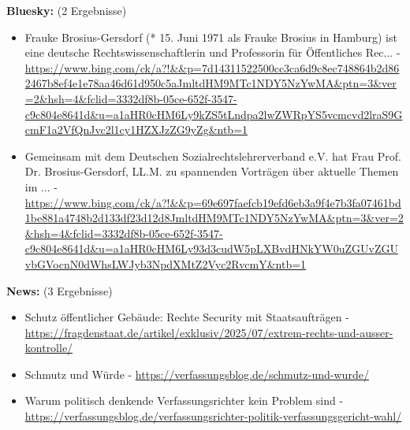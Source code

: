 \documentclass[12pt,a4paper]{article}
\begin{document}
\textbf{Bluesky:} (2 Ergebnisse)
\begin{itemize}
\item Frauke Brosius-Gersdorf (* 15. Juni 1971 als Frauke Brosius in Hamburg) ist eine deutsche Rechtswissenschaftlerin und Professorin für Öffentliches Rec... - \url{https://www.bing.com/ck/a?!&&p=7d14311522500cc3ca6d9c8ec748864b2d862467b8ef4e1e78aa46d61d950c5aJmltdHM9MTc1NDY5NzYwMA&ptn=3&ver=2&hsh=4&fclid=3332df8b-05ce-652f-3547-c9c804e8641d&u=a1aHR0cHM6Ly9kZS5tLndpa2lwZWRpYS5vcmcvd2lraS9GcmF1a2VfQnJvc2l1cy1HZXJzZG9yZg&ntb=1}
\item Gemeinsam mit dem Deutschen Sozialrechtslehrerverband e.V. hat Frau Prof. Dr. Brosius-Gersdorf, LL.M. zu spannenden Vorträgen über aktuelle Themen im ... - \url{https://www.bing.com/ck/a?!&&p=69e697faefcb19efd6eb3a9f4e7b3fa07461bd1be881a4748b2d133df23d12d8JmltdHM9MTc1NDY5NzYwMA&ptn=3&ver=2&hsh=4&fclid=3332df8b-05ce-652f-3547-c9c804e8641d&u=a1aHR0cHM6Ly93d3cudW5pLXBvdHNkYW0uZGUvZGUvbGVocnN0dWhsLWJyb3NpdXMtZ2Vyc2RvcmY&ntb=1}
\end{itemize}

\textbf{News:} (3 Ergebnisse)
\begin{itemize}
\item Schutz öffentlicher Gebäude: Rechte Security mit Staatsaufträgen - \url{https://fragdenstaat.de/artikel/exklusiv/2025/07/extrem-rechts-und-ausser-kontrolle/}
\item Schmutz und Würde - \url{https://verfassungsblog.de/schmutz-und-wurde/}
\item Warum politisch denkende Verfassungsrichter kein Problem sind - \url{https://verfassungsblog.de/verfassungsrichter-politik-verfassungsgericht-wahl/}
\end{itemize}
\end{document}

